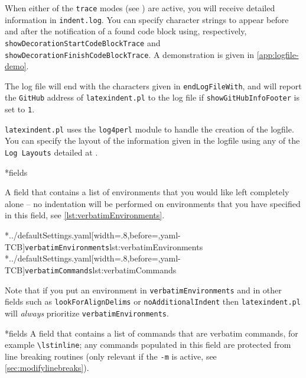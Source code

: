 	When%
	 either of the
	\texttt{trace} modes (see ) are active, you will receive
	detailed information in \texttt{indent.log}. You can specify character strings to
	appear before and after the notification of a found code block using, respectively,
	\texttt{showDecorationStartCodeBlockTrace} and \texttt{showDecorationFinishCodeBlockTrace}. A demonstration is given in
	\vref{app:logfile-demo}.

	The log file will end with the characters given in \texttt{endLogFileWith}, and will
	report the \texttt{GitHub} address of \texttt{latexindent.pl} to the log file if
	\texttt{showGitHubInfoFooter} is set to \texttt{1}.

	\texttt{latexindent.pl}%
	 uses the \texttt{log4perl} module \cite{log4perl}
	to handle the creation of the logfile. You can specify the layout of the information
	given in the logfile using any of the \texttt{Log Layouts} detailed at
	\cite{log4perl}.

*{fields}

	A field that contains a list of environments that you would like left completely alone --
	no indentation will be performed on environments that you have specified in this field,
	see \cref{lst:verbatimEnvironments}.

	\begin{cmhtcbraster}[raster column skip=.1\linewidth]
		\cmhlistingsfromfile[style=verbatimEnvironments]*{../defaultSettings.yaml}[width=.8\linewidth,before=\centering,yaml-TCB]{\texttt{verbatimEnvironments}}{lst:verbatimEnvironments}
		\cmhlistingsfromfile[style=verbatimCommands]*{../defaultSettings.yaml}[width=.8\linewidth,before=\centering,yaml-TCB]{\texttt{verbatimCommands}}{lst:verbatimCommands}
	\end{cmhtcbraster}

	Note that if you put an environment in	\texttt{verbatimEnvironments} and in other fields such
	as \texttt{lookForAlignDelims} or \texttt{noAdditionalIndent} then \texttt{latexindent.pl} will
	\emph{always} prioritize  \texttt{verbatimEnvironments}.

*{fields}
	A field that contains a list of commands that are verbatim commands, for example
	\lstinline|\lstinline|; any commands populated in this field are protected from line
	breaking routines (only relevant if the \texttt{-m} is active, see
	\vref{sec:modifylinebreaks}).

